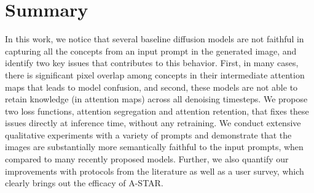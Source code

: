 \documentclass[10pt,twocolumn,letterpaper]{article}
\begin{document}
\section{Summary}

In this work, we notice that several baseline diffusion models are not faithful in capturing all the concepts from an input prompt in the generated image, and identify two key issues that contributes to this behavior. First, in many cases, there is significant pixel overlap among concepts in their intermediate attention maps that leads to model confusion, and second, these models are not able to retain knowledge (in attention maps) across all denoising timesteps. We propose two loss functions, attention segregation and attention retention, that fixes these issues directly at inference time, without any retraining. We conduct extensive qualitative experiments with a variety of prompts and demonstrate that the images are substantially more semantically faithful to the input prompts, when compared to many recently proposed models. Further, we also quantify our improvements with protocols from the literature as well as a user survey, which clearly brings out the efficacy of A-STAR. 


{\small


}


\clearpage
\end{document}
